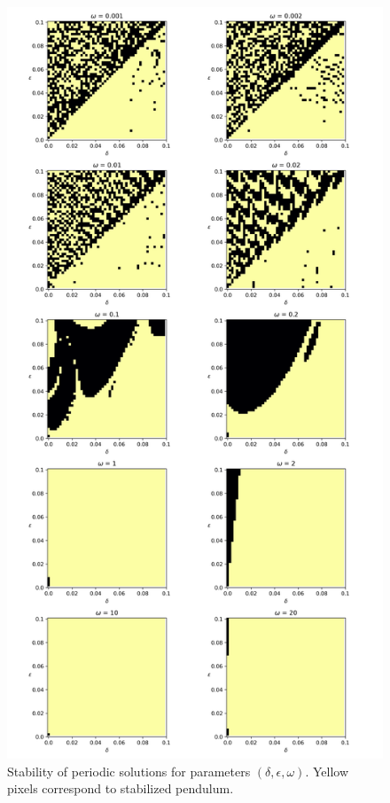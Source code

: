 \documentclass[12pt, a4paper]{article}
\begin{document}
\begin{enumerate}
\begin{enumerate}
        \begin{figure}[H]
            \centering
            \includegraphics[width=12cm]{Gamma_BW.png}
            \caption{Stability of periodic solutions for parameters $(\delta, \epsilon, \omega)$. Yellow pixels correspond to stabilized pendulum.}
        \end{figure}

        
    \end{enumerate}
\end{enumerate}
\end{document}
